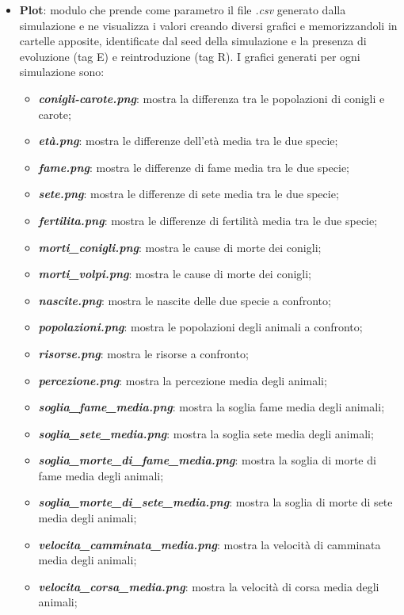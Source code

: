 \documentclass[11pt]{article}
\begin{document}
\begin{itemize}
    \item \textbf{Plot}: modulo che prende come parametro il file \textit{.csv} generato dalla simulazione e ne visualizza i valori creando diversi grafici e memorizzandoli in cartelle apposite, identificate dal seed della simulazione e la presenza di evoluzione (tag E) e reintroduzione (tag R). I grafici generati per ogni simulazione sono:
    \begin{itemize}
        \item \textbf{\textit{conigli-carote.png}}: mostra la differenza tra le popolazioni di conigli e carote;
        \item \textbf{\textit{età.png}}: mostra le differenze dell'età media tra le due specie;
        \item \textbf{\textit{fame.png}}: mostra le differenze di fame media tra le due specie;
        \item \textbf{\textit{sete.png}}: mostra le differenze di sete media tra le due specie;
        \item \textbf{\textit{fertilita.png}}: mostra le differenze di fertilità media tra le due specie;
        \item \textbf{\textit{morti\_conigli.png}}: mostra le cause di morte dei conigli;
        \item \textbf{\textit{morti\_volpi.png}}: mostra le cause di morte dei conigli;
        \item \textbf{\textit{nascite.png}}: mostra le nascite delle due specie a confronto;
        \item \textbf{\textit{popolazioni.png}}: mostra le popolazioni degli animali a confronto;
        \item \textbf{\textit{risorse.png}}: mostra le risorse a confronto;
        \item \textbf{\textit{percezione.png}}: mostra la percezione media degli animali;
        \item \textbf{\textit{soglia\_fame\_media.png}}: mostra la soglia fame media degli animali;
        \item \textbf{\textit{soglia\_sete\_media.png}}: mostra la soglia sete media degli animali;
        \item \textbf{\textit{soglia\_morte\_di\_fame\_media.png}}: mostra la soglia di morte di fame media degli animali;
        \item \textbf{\textit{soglia\_morte\_di\_sete\_media.png}}: mostra la soglia di morte di sete media degli animali;
        \item \textbf{\textit{velocita\_camminata\_media.png}}: mostra la velocità di camminata media degli animali;
        \item \textbf{\textit{velocita\_corsa\_media.png}}: mostra la velocità di corsa media degli animali;
    \end{itemize}
\end{itemize}
\end{document}
